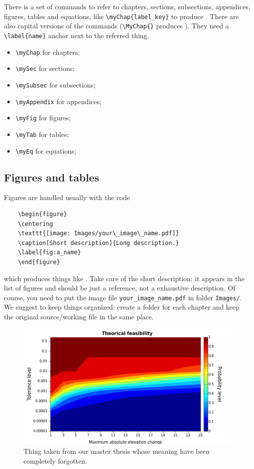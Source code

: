 There is a set of commands to refer to chapters, sections, subsections, appendices, figures, tables and equations, like \verb!\myChap{label_key}! to produce .
There are also capital versions of the commands (\verb!\MyChap{}! produces ).
They need a \verb!\label{name}! anchor next to the referred thing.
\begin{itemize}
	\item\verb!\myChap! for chapters;
	\item\verb!\mySec! for sections;
	\item\verb!\mySubsec! for subsections;
	\item\verb!\myAppendix! for appendices;
	\item\verb!\myFig! for figures;
	\item\verb!\myTab! for tables;
	\item\verb!\myEq! for equations;
\end{itemize}

\subsection{Figures and tables}
Figures are handled usually with the code
\begin{verbatim}
	\begin{figure}
	\centering
	\texttt{[image: Images/your\_image\_name.pdf]} 
	\caption[Short description]{Long description.}
	\label{fig:a_name}
	\end{figure}
\end{verbatim}
which produces things like . 
Take care of the short description: it appears in the list of figures and should be just a reference, not a exhaustive description.
Of course, you need to put the image file \verb!your_image_name.pdf! in folder \verb!Images/!.
We suggest to keep things organized: create a folder for each chapter and keep the original source/working file in the same place.
	
\begin{figure}
\centering
\includegraphics[width=\columnwidth]{Images/Technicalities/feasibilityNR51.pdf}  
\caption[Thing taken from our master thesis]{Thing taken from our master thesis whose meaning have been completely forgotten.}
\label{fig:massConstraintFeasibility}
\end{figure}

